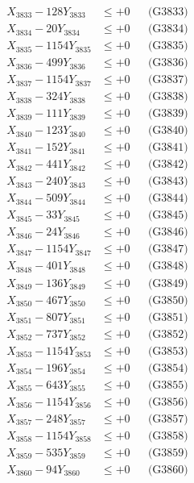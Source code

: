 \documentclass[a4paper,10pt]{article}
\begin{document}
{\begin{align}
X_{3833} - 128Y_{3833} &\leq +0 && \text{(G3833)} \\
X_{3834} - 20Y_{3834} &\leq +0 && \text{(G3834)} \\
X_{3835} - 1154Y_{3835} &\leq +0 && \text{(G3835)} \\
X_{3836} - 499Y_{3836} &\leq +0 && \text{(G3836)} \\
X_{3837} - 1154Y_{3837} &\leq +0 && \text{(G3837)} \\
X_{3838} - 324Y_{3838} &\leq +0 && \text{(G3838)} \\
X_{3839} - 111Y_{3839} &\leq +0 && \text{(G3839)} \\
X_{3840} - 123Y_{3840} &\leq +0 && \text{(G3840)} \\
\allowbreak
X_{3841} - 152Y_{3841} &\leq +0 && \text{(G3841)} \\
X_{3842} - 441Y_{3842} &\leq +0 && \text{(G3842)} \\
X_{3843} - 240Y_{3843} &\leq +0 && \text{(G3843)} \\
X_{3844} - 509Y_{3844} &\leq +0 && \text{(G3844)} \\
X_{3845} - 33Y_{3845} &\leq +0 && \text{(G3845)} \\
X_{3846} - 24Y_{3846} &\leq +0 && \text{(G3846)} \\
X_{3847} - 1154Y_{3847} &\leq +0 && \text{(G3847)} \\
X_{3848} - 401Y_{3848} &\leq +0 && \text{(G3848)} \\
X_{3849} - 136Y_{3849} &\leq +0 && \text{(G3849)} \\
X_{3850} - 467Y_{3850} &\leq +0 && \text{(G3850)} \\
\allowbreak
X_{3851} - 807Y_{3851} &\leq +0 && \text{(G3851)} \\
X_{3852} - 737Y_{3852} &\leq +0 && \text{(G3852)} \\
X_{3853} - 1154Y_{3853} &\leq +0 && \text{(G3853)} \\
X_{3854} - 196Y_{3854} &\leq +0 && \text{(G3854)} \\
X_{3855} - 643Y_{3855} &\leq +0 && \text{(G3855)} \\
X_{3856} - 1154Y_{3856} &\leq +0 && \text{(G3856)} \\
X_{3857} - 248Y_{3857} &\leq +0 && \text{(G3857)} \\
X_{3858} - 1154Y_{3858} &\leq +0 && \text{(G3858)} \\
X_{3859} - 535Y_{3859} &\leq +0 && \text{(G3859)} \\
X_{3860} - 94Y_{3860} &\leq +0 && \text{(G3860)} \\

\end{align}}
\end{document}
